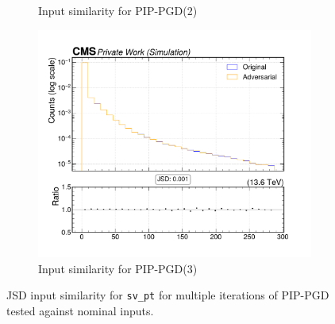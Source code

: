 \begin{figure}[htbp]
\begin{subfigure}[t]{0.32\textwidth}
    \caption*{Input similarity for PIP-PGD(2)}
  \end{subfigure}\hfill
  \begin{subfigure}[t]{0.32\textwidth}
    \includegraphics[width=\linewidth]{media/output/features/compare/combined_it_3/cmp_vtx_arr_sv_pt.pdf}
    \caption*{Input similarity for PIP-PGD(3)}
  \end{subfigure}

  \caption*{JSD input similarity for \texttt{sv\_pt} for multiple iterations of PIP-PGD tested against nominal inputs.}
  \label{fig:combined_input_sv_pt}
\end{figure}

\newpage